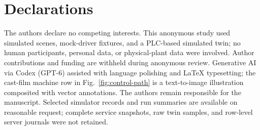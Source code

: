 \documentclass[journal]{IEEEtran}
\begin{document}
\IEEEpeerreviewmaketitle









\section*{Declarations}
The authors declare no competing interests. This anonymous study used simulated scenes, mock-driver fixtures, and a PLC-based simulated twin; no human participants, personal data, or physical-plant data were involved. Author contributions and funding are withheld during anonymous review. Generative AI via Codex (GPT-6) assisted with language polishing and LaTeX typesetting; the cast-film machine row in Fig.~\ref{fig:control-path} is a text-to-image illustration composited with vector annotations. The authors remain responsible for the manuscript. Selected simulator records and run summaries are available on reasonable request; complete service snapshots, raw twin samples, and row-level server journals were not retained.



\end{document}
